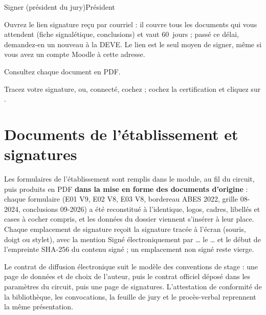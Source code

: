 \documentclass[11pt,a4paper]{article}
\begin{document}
\begin{procedure}{Signer (président du jury)}{Président}
\begin{etapes}
  \item Ouvrez le lien \og signature\fg{} reçu par courriel : il couvre tous
        les documents qui vous attendent (fiche signalétique, conclusions) et
        vaut 60~jours ; passé ce délai, demandez-en un nouveau à la DEVE.
        Le lien est le seul moyen de signer, même si vous avez un compte
        Moodle à cette adresse.
  \item Consultez chaque document en PDF.
  \item Tracez votre signature, ou, connecté, cochez  ; cochez la certification et cliquez sur
        .
\end{etapes}
\end{procedure}

\section{Documents de l'établissement et signatures}

Les formulaires de l'établissement sont remplis dans le module, au fil du
circuit, puis produits en PDF \textbf{dans la mise en forme des documents
d'origine} : chaque formulaire (E01 V9, E02 V8, E03 V8, bordereau ABES 2022,
grille 08-2024, conclusions 09-2026) a été reconstitué à l'identique,
logos, cadres, libellés et cases à cocher compris, et les données du dossier
viennent s'insérer à leur place. Chaque emplacement de signature reçoit la
signature tracée à l'écran (souris, doigt ou stylet), avec la mention
\og Signé électroniquement par \ldots{} le \ldots\fg{} et le début de
l'empreinte SHA-256 du contenu signé ; un emplacement non signé reste vierge.

Le contrat de diffusion électronique suit le modèle des conventions de stage :
une page de données et de choix de l'auteur, puis le contrat officiel déposé
dans les paramètres du circuit, puis une page de signatures. L'attestation de
conformité de la bibliothèque, les convocations, la feuille de jury et le
procès-verbal reprennent la même présentation.
\end{document}
